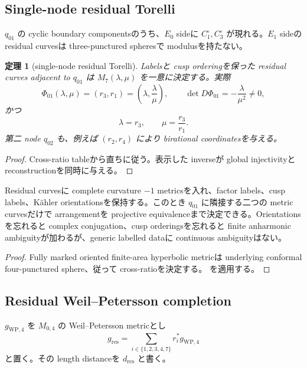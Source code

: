 \documentclass[11pt,a4paper]{ltjsarticle}
\theoremstyle{plain}
\newtheorem{theorem}{定理}[section]\newtheorem{proposition}[theorem]{命題}
\theoremstyle{definition}
\theoremstyle{remark}
\begin{document}
\subsection{Single-node residual Torelli}
$q_{01}$ の cyclic boundary componentsのうち、$E_0$ sideに $C_1^\circ,C_3^\circ$ が現れる。$E_1$ sideの residual curvesは three-punctured spheresで modulusを持たない。

\begin{theorem}[single-node residual Torelli]\label{thm:single-node-torelli}
Labelsと cusp orderingを保った residual curves adjacent to $q_{01}$ は $M_7(\lambda,\mu)$ を一意に決定する。実際
\[
 \Phi_{01}(\lambda,\mu)
 =(r_3,r_1)
 =\left(\lambda,\frac{\lambda}{\mu}\right),
 \qquad
 \det D\Phi_{01}=-\frac{\lambda}{\mu^2}\ne0,
\]
かつ
\[
 \lambda=r_3,
 \qquad
 \mu=\frac{r_3}{r_1}.
\]
第二 node $q_{02}$ も、例えば $(r_2,r_4)$ により birational coordinatesを与える。
\end{theorem}

\begin{proof}
Cross-ratio tableから直ちに従う。表示した inverseが global injectivityと reconstructionを同時に与える。
\end{proof}

\begin{corollary}\label{cor:residual-metric-torelli}
Residual curvesに complete curvature $-1$ metricsを入れ、factor labels、cusp labels、K\"ahler orientationsを保持する。このとき $q_{01}$ に隣接する二つの metric curvesだけで arrangementを projective equivalenceまで決定できる。Orientationsを忘れると complex conjugation、cusp orderingsを忘れると finite anharmonic ambiguityが加わるが、generic labelled dataに continuous ambiguityはない。
\end{corollary}

\begin{proof}
Fully marked oriented finite-area hyperbolic metricは underlying conformal four-punctured sphere、従って cross-ratioを決定する。 を適用する。
\end{proof}

\subsection{Residual Weil--Petersson completion}
$g_{\mathrm{WP},4}$ を $M_{0,4}$ の Weil--Petersson metricとし
\[
 g_{\mathrm{res}}
 =\sum_{i\in\{1,2,3,4,7\}}r_i^*g_{\mathrm{WP},4}
\]
と置く。その length distanceを $d_{\mathrm{res}}$ と書く。
\end{document}
